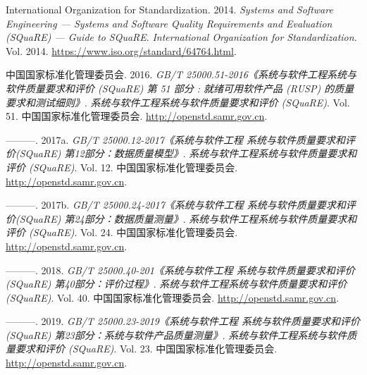 \documentclass[hyperref, a4paper]{ctexart}
\begin{document}
\hypertarget{refs}{}
\leavevmode\hypertarget{ref-innovativeInternationalisation}{}%
International Organization for Standardization. 2014. \emph{Systems and
Software Engineering --- Systems and Software Quality Requirements and
Evaluation (SQuaRE) --- Guide to SQuaRE}. \emph{International
Organization for Standardization}. Vol. 2014.
\url{https://www.iso.org/standard/64764.html}.

\leavevmode\hypertarget{ref-innovative1}{}%
中国国家标准化管理委员会. 2016. \emph{GB/T
25000.51-2016《系统与软件工程系统与软件质量要求和评价 (SQuaRE) 第 51
部分 : 就绪可用软件产品 (RUSP) 的质量要求和测试细则》}.
\emph{系统与软件工程系统与软件质量要求和评价 (SQuaRE)}. Vol. 51.
中国国家标准化管理委员会. \url{http://openstd.samr.gov.cn}.

\leavevmode\hypertarget{ref-innovative3}{}%
---------. 2017a. \emph{GB/T 25000.12-2017《系统与软件工程
系统与软件质量要求和评价(SQuaRE) 第12部分：数据质量模型》}.
\emph{系统与软件工程系统与软件质量要求和评价 (SQuaRE)}. Vol. 12.
中国国家标准化管理委员会. \url{http://openstd.samr.gov.cn}.

\leavevmode\hypertarget{ref-innovative4}{}%
---------. 2017b. \emph{GB/T 25000.24-2017《系统与软件工程
系统与软件质量要求和评价(SQuaRE) 第24部分：数据质量测量》}.
\emph{系统与软件工程系统与软件质量要求和评价 (SQuaRE)}. Vol. 24.
中国国家标准化管理委员会. \url{http://openstd.samr.gov.cn}.

\leavevmode\hypertarget{ref-innovative5}{}%
---------. 2018. \emph{GB/T 25000.40-201《系统与软件工程
系统与软件质量要求和评价(SQuaRE) 第40部分：评价过程》}.
\emph{系统与软件工程系统与软件质量要求和评价 (SQuaRE)}. Vol. 40.
中国国家标准化管理委员会. \url{http://openstd.samr.gov.cn}.

\leavevmode\hypertarget{ref-innovative2}{}%
---------. 2019. \emph{GB/T 25000.23-2019《系统与软件工程
系统与软件质量要求和评价(SQuaRE) 第23部分：系统与软件产品质量测量》}.
\emph{系统与软件工程系统与软件质量要求和评价 (SQuaRE)}. Vol. 23.
中国国家标准化管理委员会. \url{http://openstd.samr.gov.cn}.
\end{document}
